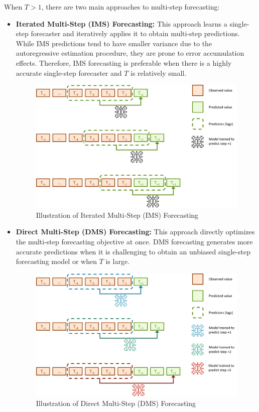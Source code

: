 When \(T > 1\), there are two main approaches to multi-step forecasting:
\begin{itemize}
    \item \textbf{Iterated Multi-Step (IMS) Forecasting:} This approach learns a single-step forecaster and iteratively applies it to obtain multi-step predictions. While IMS predictions tend to have smaller variance due to the autoregressive estimation procedure, they are prone to error accumulation effects. Therefore, IMS forecasting is preferable when there is a highly accurate single-step forecaster and \(T\) is relatively small.
    \begin{figure}[htbp]
        \centering
        \includegraphics[width=13cm]{3_ChapterTranformerVariants/figuras/IMS.pdf}
        \caption{Illustration of Iterated Multi-Step (IMS) Forecasting}
        \end{figure}
    
    \item \textbf{Direct Multi-Step (DMS) Forecasting:} This approach directly optimizes the multi-step forecasting objective at once. DMS forecasting generates more accurate predictions when it is challenging to obtain an unbiased single-step forecasting model or when \(T\) is large.
    \begin{figure}[htbp]
        \centering
        \includegraphics[width=13cm]{3_ChapterTranformerVariants/figuras/DMS.pdf}
        \caption{Illustration of Direct Multi-Step (DMS) Forecasting}
        \end{figure}
    
\end{itemize}

